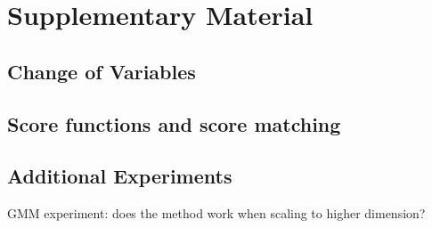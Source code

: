 \documentclass[12pt,a4paper]{report}
\begin{document}








\printbibliography[heading=bibintoc,title={Bibliography}]


\appendix
\chapter{Supplementary Material}
\section{Change of Variables}
\section{Score functions and score matching}
\section{Additional Experiments}
GMM experiment: does the method work when scaling to higher dimension? 
\end{document}

